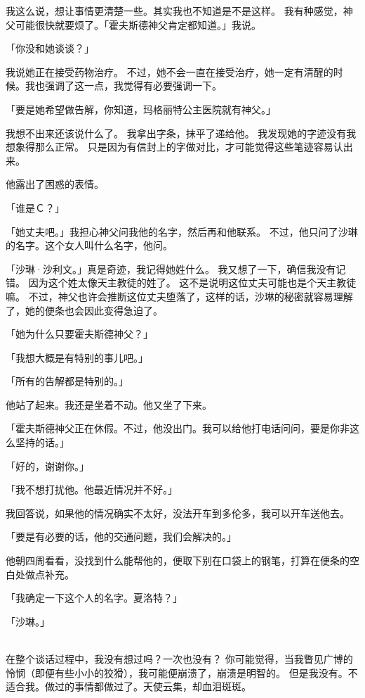 \documentclass[UTF8]{ctexart}
\begin{document}
我这么说，想让事情更清楚一些。其实我也不知道是不是这样。
我有种感觉，神父可能很快就要烦了。「霍夫斯德神父肯定都知道。」我说。

「你没和她谈谈？」

我说她正在接受药物治疗。
不过，她不会一直在接受治疗，她一定有清醒的时候。我也强调了这一点，我觉得有必要强调一下。

「要是她希望做告解，你知道，玛格丽特公主医院就有神父。」

我想不出来还该说什么了。
我拿出字条，抹平了递给他。
我发现她的字迹没有我想象得那么正常。
只是因为有信封上的字做对比，才可能觉得这些笔迹容易认出来。

他露出了困惑的表情。

「谁是Ｃ？」

「她丈夫吧。」我担心神父问我他的名字，然后再和他联系。
不过，他只问了沙琳的名字。这个女人叫什么名字，他问。

「沙琳·沙利文。」真是奇迹，我记得她姓什么。
我又想了一下，确信我没有记错。
因为这个姓太像天主教徒的姓了。
这不是说明这位丈夫可能也是个天主教徒嘛。
不过，神父也许会推断这位丈夫堕落了，这样的话，沙琳的秘密就容易理解了，她的便条也会因此变得急迫了。

「她为什么只要霍夫斯德神父？」

「我想大概是有特别的事儿吧。」

「所有的告解都是特别的。」

他站了起来。我还是坐着不动。他又坐了下来。

「霍夫斯德神父正在休假。不过，他没出门。我可以给他打电话问问，要是你非这么坚持的话。」

「好的，谢谢你。」

「我不想打扰他。他最近情况并不好。」

我回答说，如果他的情况确实不太好，没法开车到多伦多，我可以开车送他去。

「要是有必要的话，他的交通问题，我们会解决的。」

他朝四周看看，没找到什么能帮他的，便取下别在口袋上的钢笔，打算在便条的空白处做点补充。

「我确定一下这个人的名字。夏洛特？」

「沙琳。」

~\\

在整个谈话过程中，我没有想过吗？一次也没有？
你可能觉得，当我瞥见广博的怜悯（即便有些小小的狡猾），我可能便崩溃了，崩溃是明智的。
但是我没有。不适合我。做过的事情都做过了。天使云集，却血泪斑斑。

~\\
\end{document}
